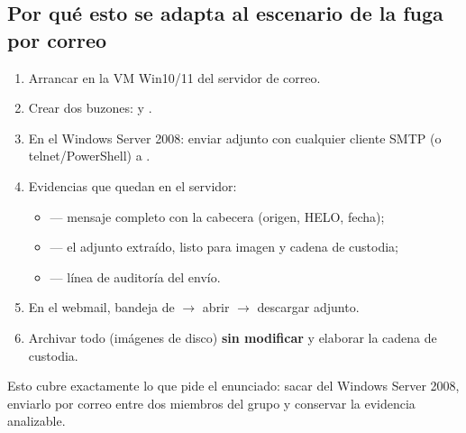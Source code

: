 \subsection{Por qué esto se adapta al escenario de la fuga por correo}

\begin{enumerate}
  \item Arrancar  en la VM Win10/11 del servidor de correo.
  \item Crear dos buzones:  y
        .
  \item En el Windows Server 2008: enviar  adjunto con
        cualquier cliente SMTP (o telnet/PowerShell) a
        .
  \item Evidencias que quedan en el servidor:
        \begin{itemize}
          \item {} --- mensaje
                completo con la cabecera  (origen, HELO,
                fecha);
          \item {} ---
                el adjunto extraído, listo para imagen y cadena de custodia;
          \item {} --- línea de auditoría del
                envío.
        \end{itemize}
  \item En el webmail, bandeja de  $\rightarrow$ abrir $\rightarrow$
        descargar adjunto.
  \item Archivar todo (imágenes de disco) \textbf{sin modificar} y elaborar la
        cadena de custodia.
\end{enumerate}

Esto cubre exactamente lo que pide el enunciado: sacar 
del Windows Server 2008, enviarlo por correo entre dos miembros del grupo y
conservar la evidencia analizable.



